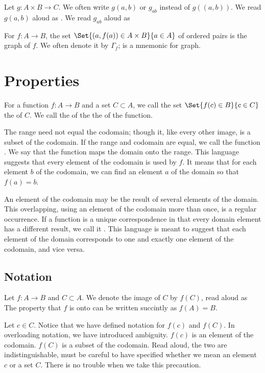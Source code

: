 Let $g: A \times B \to C$.
We often write $g(a,b)$ or $g_{ab}$ instead of $g((a,b))$. We read $g(a, b)$ aloud as .
We read $g_{ab}$ aloud as 

For  $f: A \to B$, the set $\Set{(a, f(a)) \in A \cross B}{a \in A}$ of ordered pairs is the graph of $f$.
We often denote it by $\Gamma_f$;  is a mnemonic for graph.

\section{Properties}

For a function $f: A \to B$ and a set $C \subset A$, we call the set $\Set{f(c) \in B}{c \in C}$ the  of $C$.
We call the  of the  the  of the function.

The range need not equal the codomain; though it, like every other image, is a subset of the codomain.
If the range and codomain are equal, we call the function .
We say that the function maps the domain onto the range.
This language suggests that every element of the codomain is used by $f$.
It means that for each element $b$ of the codomain, we can find an element $a$ of the domain so that $f(a) = b$.

An element of the codomain may be the result of several elements of the domain.
This overlapping, using an element of the codomain more than once, is a regular occurrence.
If a function is a unique correspondence in that every domain element has a different result, we call it .
This language is meant to suggest that each element of the domain corresponds to one and exactly one element of the codomain, and vice versa.

\subsection{Notation}

Let $f: A \to B$ and $C \subset A$.
We denote the image of $C$ by $f(C)$, read aloud as 
The property that $f$ is onto can be written succintly as $f(A) = B$.

Let $c \in C$.
Notice that we have defined notation for $f(c)$ and $f(C)$.
In overloading notation, we have introduced ambiguity.
$f(c)$ is an element of the codomain.
$f(C)$ is a subset of the codomain.
Read aloud, the two are indistinguishable, must be careful to have specified whether we mean an element $c$ or a set $C$.
There is no trouble when we take this precaution.


